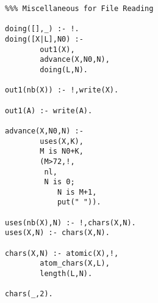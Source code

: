 \begin{verbatim}
%%% Miscellaneous for File Reading

doing([],_) :- !.
doing([X|L],N0) :-
        out1(X),
        advance(X,N0,N),
        doing(L,N).

out1(nb(X)) :- !,write(X).

out1(A) :- write(A).

advance(X,N0,N) :-
        uses(X,K),
        M is N0+K,
        (M>72,!,
         nl,
         N is 0;
            N is M+1,
            put(" ")).

uses(nb(X),N) :- !,chars(X,N).
uses(X,N) :- chars(X,N).

chars(X,N) :- atomic(X),!,
        atom_chars(X,L),
        length(L,N).

chars(_,2).
\end{verbatim}
